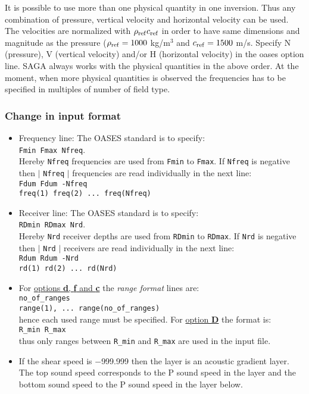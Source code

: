 \documentclass{saclantc}
\begin{document}
It is possible to use more than one physical quantity in one
inversion. Thus any combination of pressure, vertical velocity and
horizontal velocity can be used. The velocities are normalized with 
$\rho_{ \rm ref} c_{ \rm ref}$  in order to have
same dimensions and magnitude as the pressure ($\rho_{ \rm ref}=
1000$ kg/m$^3$ and $c_{ \rm ref}=1500$ m/s.
Specify N  (pressure), V (vertical velocity) and/or
H (horizontal velocity) in the oases option line. SAGA always works
with the physical quantities in the above order.
At the moment, when more physical  quantities is observed the frequencies has to be
specified in multiples of number of field type.




\subsubsection{Change in input format}
\begin{itemize}
\item Frequency line: The {\sf OASES} standard is to specify: \\
{\tt Fmin Fmax Nfreq}.\\
Hereby {\tt  Nfreq} frequencies are used from {\tt Fmin} to {\tt Fmax}.
 If {\tt Nfreq} is negative then $\mid$ {\tt Nfreq} $\mid$ frequencies are
read individually in the next line:\\
{\tt Fdum Fdum -Nfreq} \\
{\tt freq(1) freq(2) ... freq(Nfreq) }
\item Receiver line: The {\sf OASES} standard is to specify: \\
{\tt RDmin RDmax Nrd}.\\
Hereby {\tt  Nrd} receiver depths are used from {\tt RDmin} to {\tt RDmax}.
 If {\tt Nrd} is negative then $\mid$ {\tt Nrd} $\mid$ receivers are 
read individually in the next line:\\
{\tt Rdum Rdum -Nrd} \\
{\tt rd(1) rd(2) ... rd(Nrd) }
\item For \underline{options {\bf d}, {\bf f} and {\bf c}} the {\it
range format} lines are:\\
{\tt no\_of\_ranges}\\
{\tt range(1), ... range(no\_of\_ranges)}\\
hence each used range must be specified. For \underline{option {\bf D}}
the format is:\\
{\tt R\_min R\_max}\\
thus only ranges between {\tt R\_min} and {\tt R\_max} are used in the
input file.
\item If the shear speed is $- $999.999 then the layer is an acoustic
 gradient layer. The top sound speed corresponds to the P sound speed
in the 
layer and the bottom sound speed to the P sound speed in the layer
below. 
\end{itemize}
\end{document}
